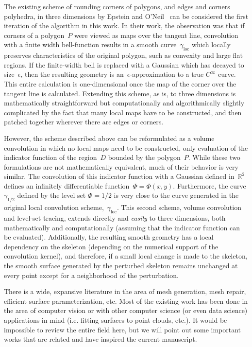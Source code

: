 \documentclass[11pt]{article}
\numberwithin{equation}{section}
\newcommand\bbR{\mathbb R}
\begin{document}
The existing scheme of rounding corners of polygons, and edges and
corners polyhedra, in three dimensions
by Epstein and O'Neil~\cite{epstein_2016} can be considered the first
iteration of the algorithm in this work. In their work, the
observation was that if corners of a polygon~$P$ were viewed as
maps over the tangent line, convolution with a finite width
bell-function results in a smooth curve~$\gamma_{\text{loc}}$
which locally preserves
characteristics of the original polygon, such as convexity and large
flat regions. If the finite-width bell is
replaced with a Gaussian which has decayed to
size~$\epsilon$, then the resulting geometry is
an~$\epsilon$-approximation to a true $C^\infty$ curve.
This entire calculation is one-dimensional once the map
of the corner over the tangent line is calculated. Extending this
scheme, as is, to three dimensions is mathematically straightforward
but computationally and algorithmically slightly complicated by the
fact that many local maps have to be constructed, and then patched
together wherever there are edges or corners.

However, the scheme described above can be reformulated as a volume
convolution in which no local maps need to be constructed, only
evaluation of the indicator function of the region~$D$ bounded
by the polygon~$P$. While these two formulations are not
mathematically equivalent, much of their behavior is very similar.
The convolution of this indicator function
with a Gaussian defined in~$\bbR^2$ defines an infinitely
differentiable function~$\Phi = \Phi(x,y)$.
Furthermore, the curve $\gamma_{1/2}$ defined by the level
set $\Phi = 1/2$ is very close to the curve generated in the
original local convolution scheme,~$\gamma_{\text{loc}}$.
This second scheme, volume convolution and level-set tracing, extends
directly and \emph{easily} to three dimensions, both mathematically
and computationally (assuming that the indicator function can be
evaluated).
Additionally,  the resulting smooth geometry has a local dependency on the
skeleton (depending on the numerical support of the convolution
kernel), and therefore, if a small local change is made to the
skeleton, the smooth surface generated by the perturbed skeleton
remains unchanged at every point except for a neighborhood of the
perturbation.

There is a wide, expansive literature in the area of mesh generation,
mesh repair, efficient surface parameterization, etc. Most of the
existing work has been done in the area of computer vision or with
other computer science (or even data science) applications in mind
(i.e. fitting surfaces to point clouds, etc.). It would be impossible
to review the entire field here, but we will point out some important
works that are related and have inspired the current manuscript.
\end{document}

